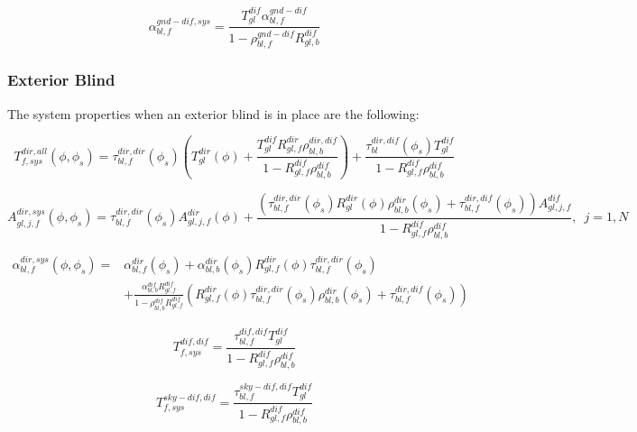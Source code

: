 \begin{equation}
\alpha_{bl,f}^{gnd - dif,sys} = \frac{{T_{gl}^{dif}\alpha_{bl,f}^{gnd - dif}}}{{1 - \rho_{bl,f}^{gnd - dif}R_{gl,b}^{dif}}}
\end{equation}

\subsubsection{Exterior Blind}\label{exterior-blind}

The system properties when an exterior blind is in place are the following:

\begin{equation}
T_{f,sys}^{dir,all}(\phi ,{\phi_s}) = \tau_{bl,f}^{dir,dir}({\phi_s})\left( {T_{gl}^{dir}(\phi ) + \frac{{T_{gl}^{dif}R_{gl,f}^{dir}\rho_{bl,b}^{dir,dif}}}{{1 - R_{gl,f}^{dif}\rho_{bl,b}^{dif}}}} \right) + \frac{{\tau_{bl}^{dir,dif}({\phi_s})T_{gl}^{dif}}}{{1 - R_{gl,f}^{dif}\rho_{bl,b}^{dif}}}
\end{equation}

\begin{equation}
A_{gl,j,f}^{dir,sys}(\phi ,\phi_s) = 
     \tau_{bl,f}^{dir,dir}(\phi_s) A_{gl,j,f}^{dir}(\phi ) + 
     \frac{
       \left(
         \tau_{bl,f}^{dir,dir}(\phi_s) R_{gl}^{dir}(\phi) \rho_{bl,b}^{dir}(\phi_s)+ \tau_{bl,f}^{dir,dif}(\phi_s)
       \right) A_{gl,j,f}^{dif}
     } {
       1 - R_{gl,f}^{dif}\rho_{bl,b}^{dif}
     },\;~j = 1,N
\end{equation}

\begin{equation}
\begin{split}
\alpha_{bl,f}^{dir,sys}(\phi ,\phi_s) =& \alpha_{bl,f}^{dir}(\phi_s) + \alpha_{bl,b}^{dir}(\phi_s) R_{gl,f}^{dir}(\phi) \tau_{bl,f}^{dir,dir}(\phi_s) \\
&+ \frac{\alpha_{bl,b}^{dif}R_{gl,f}^{dif}}{1 - \rho_{bl,b}^{dif} R_{gl,f}^{dif}}\left(R_{gl,f}^{dir}(\phi) \tau_{bl,f}^{dir,dir}(\phi_s) \rho_{bl,b}^{dir}(\phi_s) + \tau_{bl,f}^{dir,dif}(\phi_s) \right)
\end{split}
\end{equation}

\begin{equation}
T_{f,sys}^{dif,dif} = \frac{{\tau_{bl,f}^{dif,dif}T_{gl}^{dif}}}{{1 - R_{gl,f}^{dif}\rho_{bl,b}^{dif}}}
\end{equation}

\begin{equation}
T_{f,sys}^{sky - dif,dif} = \frac{{\tau_{bl,f}^{sky - dif,dif}T_{gl}^{dif}}}{{1 - R_{gl,f}^{dif}\rho_{bl,b}^{dif}}}
\end{equation}

